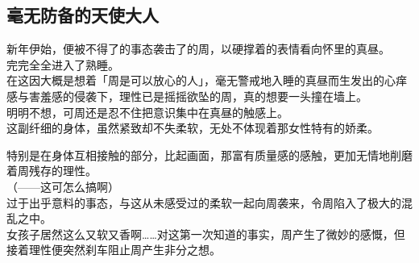 \subsection{毫无防备的天使大人}


新年伊始，便被不得了的事态袭击了的周，以硬撑着的表情看向怀里的真昼。\\

完完全全进入了熟睡。\\

在这因大概是想着「周是可以放心的人」，毫无警戒地入睡的真昼而生发出的心痒感与害羞感的侵袭下，理性已是摇摇欲坠的周，真的想要一头撞在墙上。\\

明明不想，可周还是忍不住把意识集中在真昼的触感上。\\

这副纤细的身体，虽然紧致却不失柔软，无处不体现着那女性特有的娇柔。

特别是在身体互相接触的部分，比起画面，那富有质量感的感触，更加无情地削磨着周残存的理性。\\

（——这可怎么搞啊）\\

过于出乎意料的事态，与这从未感受过的柔软一起向周袭来，令周陷入了极大的混乱之中。\\

女孩子居然这么又软又香啊……对这第一次知道的事实，周产生了微妙的感慨，但接着理性便突然刹车阻止周产生非分之想。\\

